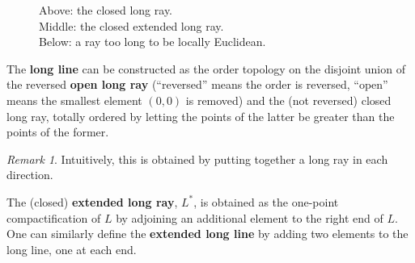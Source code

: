\documentclass[12pt, letterpaper]{article}
\theoremstyle{definition}
\theoremstyle{remark}
\newtheorem*{rem*}{Remark}
\theoremstyle{definition}
\theoremstyle{plain}
\numberwithin{equation}{section}
\begin{document}
	\begin{figure}[H]
		\centering
		\caption{Above: the closed long ray.\\Middle: the closed extended long ray.\\Below: a ray too long to be locally Euclidean.}
		\label{fig:closed_long_ray}
	\end{figure}

	\begin{def*}
		The \textbf{long line} can be constructed as the order topology on the disjoint union of the reversed \textbf{open long ray}
		(``reversed'' means the order is reversed, ``open'' means the smallest element $(0,0)$ is removed)
		and the (not reversed) closed long ray, totally ordered by letting the points of the latter be greater than the points of the former.
	\end{def*}
	\begin{rem*}
		Intuitively, this is obtained by putting together a long ray in each direction.
	\end{rem*}

	\begin{def*}
		The (closed) \textbf{extended long ray}, $L^{*}$, is obtained as the one-point compactification of $L$
		by adjoining an additional element to the right end of $L$.\\
		One can similarly define the \textbf{extended long line} by adding two elements to the long line, one at each end.
	\end{def*}
\end{document}
